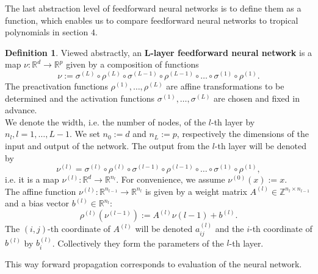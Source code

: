 \documentclass{article}
\theoremstyle{definition}
\newtheorem{definition}[theorem]{Definition}
\begin{document}
The last abstraction level of feedforward neural networks is to define them as a function, which enables us to compare feedforward neural networks to tropical polynomials in section $4$.

\begin{definition}\hspace{1sp}\cite{zhang2018tropical}\label{def:nur_net_fkt}
Viewed abstractly, an \textbf{L-layer feedforward neural network} is a map $\nu : \mathbb{R}^{d} \to \mathbb{R}^{p}$ given by a composition of functions
$$ \nu := \sigma^{(L)} \circ \rho^{(L)} \circ \sigma^{(L-1)} \circ \rho^{(L-1)} \circ \dots \circ \sigma^{(1)} \circ \rho^{(1)}.$$
The preactivation functions $\rho^{(1)}, \dots , \rho^{(L)}$ are affine transformations to be determined and the activation functions $\sigma^{(1)}, \dots , \sigma^{(L)}$ are chosen and fixed in advance. \\
We denote the width, i.e. the number of nodes, of the $l$-th
layer by $n_l, l = 1, \dots , L-1$. We set $n_0 := d$ and $n_L := p$, respectively the dimensions of the input and output of the network. The output from the $l$-th layer will be denoted by
$$\nu^{(l)} = \sigma^{(l)} \circ \rho^{(l)} \circ \sigma^{(l-1)} \circ \rho^{(l-1)} \circ \dots \circ \sigma^{(1)} \circ \rho^{(1)},$$
i.e. it is a map $\nu^{(l)} : \mathbb{R}^{d} \to \mathbb{R}^{n_l}$. For convenience, we assume $\nu^{(0)}(x) := x$. \\
The affine function $\nu^{(l)} : \mathbb{R}^{n_{l-1}} \to \mathbb{R}^{n_{l}}$ is given by a weight matrix $A^{(l)} \in \mathbb{Z}^{n_l \times n_{l-1}} $ and a bias vector $b^{(l)} \in \mathbb{R}^{n_l}$:
$$ \rho^{(l)}(\nu^{(l-1)}) := A^{(l)} \nu{(l-1)} + b^{(l)}. $$
The $(i, j)$-th coordinate of $A^{(l)}$ will be denoted $a^{(l)}_{ij}$ and the $i$-th coordinate of $b^{(l)}$ by $b^{(l)}_{i}$. Collectively they form the parameters of the $l$-th layer.
\end{definition}

This way forward propagation corresponds to evaluation of the neural network.
\end{document}
